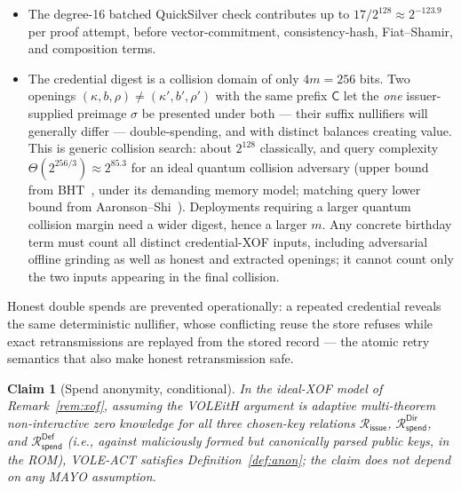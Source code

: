 \documentclass[11pt]{article}
\newtheorem{claim}{Claim}
\newcommand{\Cred}{\mathsf{C}}
\begin{document}
\begin{itemize}
  \item The degree-16 batched QuickSilver check contributes up to
  $17/2^{128} \approx 2^{-123.9}$ per proof attempt, before
  vector-commitment, consistency-hash, Fiat--Shamir, and composition terms.
  \item The credential digest is a collision domain of only $4m = 256$
  bits. Two openings $(\kappa,b,\rho) \ne (\kappa',b',\rho')$ with the same
  prefix $\Cred$ let the \emph{one} issuer-supplied preimage $\sigma$ be
  presented under both --- their suffix nullifiers will generally differ ---
  double-spending, and with distinct balances creating value. This is
  generic collision search: about $2^{128}$ classically, and query
  complexity $\Theta(2^{256/3}) \approx 2^{85.3}$ for an ideal quantum
  collision adversary (upper bound from BHT~\cite{BHT}, under its
  demanding memory model; matching query lower bound from
  Aaronson--Shi~\cite{AaronsonShi}).
  Deployments requiring a larger quantum collision margin need a wider
  digest, hence a larger $m$. Any concrete birthday term must count all
  distinct credential-XOF inputs, including adversarial offline grinding as
  well as honest and extracted openings; it cannot count only the two inputs
  appearing in the final collision.
\end{itemize}
Honest double spends are prevented operationally: a repeated credential
reveals the same deterministic nullifier, whose conflicting reuse the
store refuses while exact retransmissions are replayed from the stored
record --- the atomic retry semantics that also make honest
retransmission safe.

\begin{claim}[Spend anonymity, conditional]
\label{claim:anon}
In the ideal-XOF model of Remark~\ref{rem:xof}, assuming the VOLEitH
argument is adaptive multi-theorem non-interactive zero knowledge for all
three chosen-key relations $\mathcal{R}_{\mathsf{issue}}$,
$\mathcal{R}_{\mathsf{spend}}^{\mathsf{Dir}}$, and
$\mathcal{R}_{\mathsf{spend}}^{\mathsf{Def}}$ (i.e., against maliciously
formed but canonically parsed public keys, in the ROM), VOLE-ACT satisfies
Definition~\ref{def:anon}; the claim does not depend on any MAYO
assumption.
\end{claim}
\end{document}

